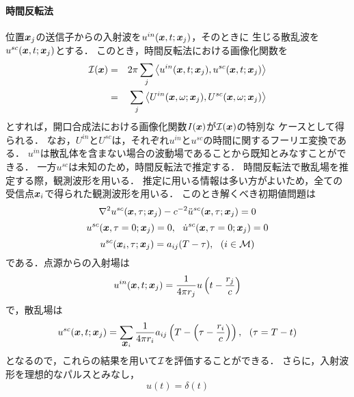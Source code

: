 \paragraph{時間反転法}
位置$\mbox{\boldmath $x$}_j$の送信子からの入射波を$u^{in}(\mbox{\boldmath $x$},t;\mbox{\boldmath $x$}_j)$，そのときに
生じる散乱波を$u^{sc}(\mbox{\boldmath $x$},t;\mbox{\boldmath $x$}_j)$とする．
このとき，時間反転法における画像化関数を
\begin{eqnarray}
	{\cal I}(\mbox{\boldmath $x$})
		&=&
	2\pi
	\sum_{j}
	\left<
		u^{in}(\mbox{\boldmath $x$},t;\mbox{\boldmath $x$}_j), u^{sc}(\mbox{\boldmath $x$},t;\mbox{\boldmath $x$}_j)
	\right>
	\\
	&=&
	\sum_{j}
	\left<
		U^{in}(\mbox{\boldmath $x$},\omega;\mbox{\boldmath $x$}_j), U^{sc}(\mbox{\boldmath $x$},\omega;\mbox{\boldmath $x$}_j)
	\right>
	\label{eqn:XXX_Ix_trev}
\end{eqnarray}
とすれば，開口合成法における画像化関数$I(\mbox{\boldmath $x$})$が${\cal I}(\mbox{\boldmath $x$})$の特別な
ケースとして得られる．
なお，$U^{in}$と$U^{sc}$は，それぞれ$u^{in}$と$u^{sc}$の時間に関するフーリエ変換である．
$u^{in}$は散乱体を含まない場合の波動場であることから既知とみなすことができる．
一方$u^{sc}$は未知のため，時間反転法で推定する．
時間反転法で散乱場を推定する際，観測波形を用いる．
推定に用いる情報は多い方がよいため，全ての受信点$\mbox{\boldmath $x$}_i$で得られた観測波形を用いる．
このとき解くべき初期値問題は
\begin{equation}
	\nabla ^2 u^{sc}(\mbox{\boldmath $x$},\tau;\mbox{\boldmath $x$}_j)-c^{-2}\ddot{u}^{sc}(\mbox{\boldmath $x$},\tau; \mbox{\boldmath $x$}_j)=0
	\label{eqn:XXX_29}
\end{equation}
\begin{equation}
	u^{sc}(\fat{x},\tau=0;\fat{x}_j)=0, \ \ 
	\dot{u}^{sc}(\fat{x},\tau=0;\fat{x}_j)=0
	\label{eqn:XXX_30}
\end{equation}
\begin{equation}
	u^{sc}(\mbox{\boldmath $x$}_i,\tau;\mbox{\boldmath $x$}_j)=a_{ij}(T-\tau), \ \ (i \in {\cal M})
	\label{eqn:XXX_31}
\end{equation}
である．点源からの入射場は
\begin{equation}
	u^{in}(\mbox{\boldmath $x$},t;\mbox{\boldmath $x$}_j)=\frac{1}{4\pi r_j}u\left(t-\frac{r_j}{c}\right)
	\label{eqn:XXX_32}
\end{equation}
で，散乱場は
\begin{equation}
	u^{sc}(\mbox{\boldmath $x$},t;\mbox{\boldmath $x$}_j)=\sum_{\mbox{\boldmath $x$}_i}
	\frac{1}{4\pi r_i}a_{ij}\left(T-\left(\tau-\frac{r_i}{c}\right)\right), \ \ (\tau=T-t)
	\label{eqn:XXX_33}
\end{equation}
となるので，これらの結果を用いて$\cal I$を評価することができる．
さらに，入射波形を理想的なパルスとみなし，
\begin{equation}
	u(t)=\delta(t)
	\label{eqn:XXX_34}
\end{equation}
